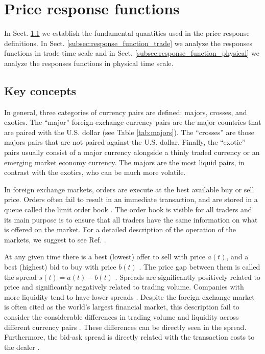 \section{Price response functions}
\label{sec:response_functions}
In Sect. \ref{subsec:key_concepts} we establish the fundamental quantities used
in the price response definitions.
In Sect. \ref{subsec:response_function_trade} we analyze the responses
functions in trade time scale and in Sect. \ref{subsec:response_function_physical}
we analyze the responses functions in physical time scale.

\subsection{Key concepts}\label{subsec:key_concepts}

In general, three categories of currency pairs are defined: majors, crosses,
and exotics. The ``major'' foreign exchange currency pairs are the major
countries that are paired with the U.S. dollar (see Table \ref{tab:majors}).
The ``crosses'' are those majors pairs that are not paired against the U.S.
dollar. Finally, the ``exotic'' pairs usually consist of a major currency
alongside a thinly traded currency or an emerging market economy currency.
The majors are the most liquid pairs, in contrast with the exotics, who can be
much more volatile.

In foreign exchange markets, orders are execute at the best available buy or
sell price. Orders often fail to result in an immediate transaction, and are
stored in a queue called the limit order book
\cite{stat_prop,predictive_pow,forex_structure,intro_market_micro,forex_market_micro,prop_order_book}.
The order book is visible for all traders and its main purpose is to ensure
that all traders have the same information on what is offered on the market.
For a detailed description of the operation of the markets, we suggest to see
Ref. \cite{my_paper_response_financial}.

At any given time there is a best (lowest) offer to sell with price
$a\left(t\right)$, and a best (highest) bid to buy with price $b\left(t\right)$
\cite{subtle_nature,account_spread,limit_ord_spread,prop_order_book,stat_theory}.
The price gap between them is called the spread
$s\left(t\right) = a\left(t\right)-b\left(t\right)$
\cite{subtle_nature,market_digest,Bouchaud_2004,account_spread,teach_spread,large_prices_changes,em_stylized_facts,stat_theory}.
Spreads are significantly positively related to price and significantly
negatively related to trading volume. Companies with more liquidity tend to
have lower spreads
\cite{components_spread_tokyo,effects_spread,account_spread,components_spread}.
Despite the foreign exchange market is often cited as the world's largest
financial market, this description fail to consider the considerable differences
in trading volume and liquidity across different currency pairs
\cite{forex_microstructure}. These differences can be directly seen in the
spread. Furthermore, the bid-ask spread is directly related with the
transaction costs to the dealer \cite{teach_spread,spread_futures}.

